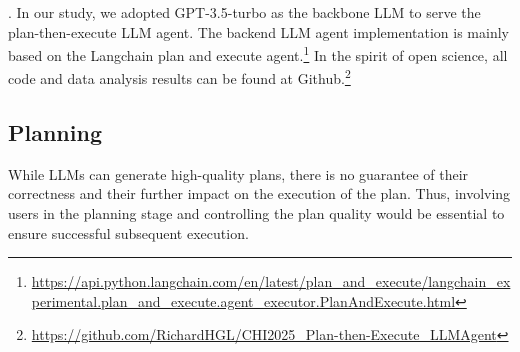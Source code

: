 
. In our study, we adopted GPT-3.5-turbo as the backbone LLM to serve the plan-then-execute LLM agent. The backend LLM agent implementation is mainly based on the Langchain plan and execute agent.\footnote{\url{https://api.python.langchain.com/en/latest/plan_and_execute/langchain_experimental.plan_and_execute.agent_executor.PlanAndExecute.html}} 
In the spirit of open science, all code and data analysis results can be found at Github.\footnote{\url{https://github.com/RichardHGL/CHI2025_Plan-then-Execute_LLMAgent}}

\subsection{Planning}
\label{sec-method-planning}
While LLMs can generate high-quality plans, there is no guarantee of their correctness and their further impact on the execution of the plan. 
Thus, involving users in the planning stage and controlling the plan quality would be essential to ensure successful subsequent execution. 

